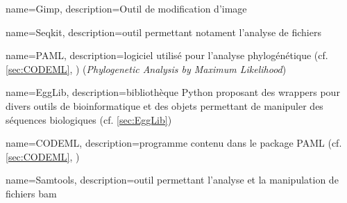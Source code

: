  {
    name=Gimp,
    description={Outil de modification d'image \cite{gimp}}
}
\newcommand{\gimp}{\gls{gimp}}

 {
    name=Seqkit,
    description={outil permettant notament l'analyse de fichiers \fastq\,\cite{seqkit1} \cite{seqkit2}}
}

 {
    name=PAML,
    description={logiciel utilisé pour l'analyse phylogénétique (cf. \cref{sec:CODEML}, \cite{yang_paml_2020}) (\textit{Phylogenetic Analysis by Maximum Likelihood})}
}

 {
    name=EggLib,
    description={bibliothèque \gls{Python} proposant des \glspl{wrapper} pour divers outils de bioinformatique et des objets permettant de manipuler des séquences biologiques (cf. \cref{sec:EggLib}) \cite{siol_egglib_2022}}
}

 {
    name=CODEML,
    description={programme  contenu dans le package \gls{PAML} (cf. \cref{sec:CODEML}, \cite{noauthor_paml-tutorialpositive-selection_nodate})}
}

 {
    name=Samtools,
    description={outil permettant l'analyse et la manipulation de fichiers \gls{bam}}
}



\newcommand{\SNP}{\acrshort{snp}}
\newcommand{\SNPFULL}{\acrfull{snp}}


\newcommand{\TrEx}{\acrshort{TrEx}}

\newcommand{\GeMo}{\acrshort{GeMo}}

\newcommand{\TrMo}{\acrshort{TrMo}}

\newcommand{\OldBam}{\acrshort{oldBAM}}



\newcommand{\ARN}{ARN}



